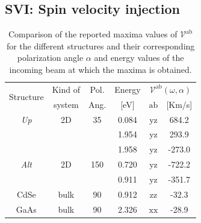 \documentclass[prb,11pt,tightenlines,twocolumn,aps]{revtex4-1}
\begin{document}

\subsection{SVI: Spin velocity injection} %
\label{sec:res-spin_velocity}

\begin{table}[b]
\begin{tabular}{cccccc}
\hline
\multirow{2}{*}{Structure \quad} & 
Kind of \quad & 
Pol. &
Energy & 
\multicolumn{2}{c}{$\mathcal{V}^{\mathrm{ab}}(\omega,\alpha)$}\\
\cline{5-6}
& system & Ang. & [eV] & $\mathrm{ab}$ \quad & [Km/s]\\
\hline
\emph{Up}    & 2D   & 35    & 0.084  & $\mathrm{yz}$ &  684.2    \\
             &      &       & 1.954  & $\mathrm{yz}$ &  293.9    \\
             &      &       & 1.958  & $\mathrm{yz}$ & -273.0    \\
\emph{Alt}   & 2D   & 150   & 0.720  & $\mathrm{yz}$ & -722.2    \\
             &      &       & 0.911  & $\mathrm{yz}$ & -351.7    \\
 CdSe        & bulk & 90    & 0.912  & $\mathrm{zz}$ &  -32.3    \\
 GaAs        & bulk & 90    & 2.326  & $\mathrm{xx}$ &  -28.9    \\
\hline
\end{tabular}

\caption{Comparison of the reported maxima values of
$\mathcal{V}^{\mathrm{ab}}$ for the different structures and their
corresponding polarization angle $\alpha$ and energy values of the incoming
beam at which the maxima is obtained.}
\label{tab:vab-str-comp}
\end{table}
\end{document}
